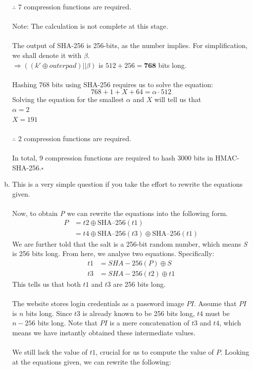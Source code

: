 \documentclass[12pt]{article}
\begin{document}
\begin{enumerate}[(a)]
$\therefore$ 7 compression functions are required.\\\\\text{*}Note: The calculation is not complete at this stage.\\\\The output of SHA-256 is 256-bits, as the number implies. For simplification, we shall denote it with $\beta$.\\
$\Rightarrow ((k'\oplus outerpad)|| \beta)$ is $512+256=\textbf{768}$ bits long.\\\\
Hashing 768 bits using SHA-256 requires us to solve the equation:
\begin{equation*}
768+1+X+64=\alpha\cdot 512
\end{equation*}
Solving the equation for the smallest $\alpha$ and $X$ will tell us that
\\$\alpha=2$\\$X=191$\\\\
$\therefore$ 2 compression functions are required.\\\\In total, 9 compression functions are required to hash 3000 bits in HMAC-SHA-256.\hfill $\square$
\item This is a very simple question if you take the effort to rewrite the equations given.\\\\Now, to obtain \textit{P} we can rewrite the equations into the following form.
\begin{equation*}
\begin{split}
P&=t2\oplus \text{SHA--}256(t1)\\
&=t4\oplus \text{SHA--}256(t3)\oplus \text{SHA--}256(t1)
\end{split}
\end{equation*}
We are further told that the salt is a 256-bit random number, which means \textit{S} is 256 bits long. From here, we analyse two equations. Specifically:
\begin{equation*}
\begin{split}
t1&=SHA-256(P)\oplus S\\
t3&=SHA-256(t2)\oplus t1
\end{split}
\end{equation*}
This tells us that both $t1$ and $t3$ are 256 bits long.\\\\The website stores login credentials as a password image $PI$. Assume that $PI$ is $n$ bits long. Since $t3$ is already known to be 256 bits long, $t4$ must be $n-256$ bits long. Note that $PI$ is a mere concatenation of $t3$ and $t4$, which means we have instantly obtained these intermediate values.\\\\We still lack the value of $t1$, crucial for us to compute the value of $P$. Looking at the equations given, we can rewrite the following:

\end{enumerate}
\end{document}
